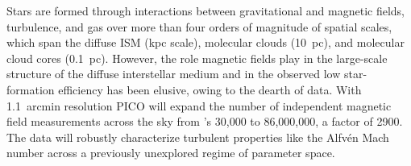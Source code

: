 \documentclass[PICOAPC.tex]{subfiles}
\begin{document}
Stars are formed through interactions between gravitational and magnetic fields, turbulence, and gas over more than four orders of magnitude of spatial scales, which span the diffuse ISM (kpc scale), molecular clouds (10~pc), and molecular cloud cores (0.1~pc). However, the role magnetic fields play in the large-scale structure of the diffuse interstellar medium and in the observed low star-formation efficiency has been elusive, owing to the dearth of data. 
With 1.1~arcmin resolution PICO will expand the number of independent magnetic field measurements across the sky from \planck 's  30,000 to 86,000,000, a factor of 2900. The data will robustly characterize turbulent properties like the Alfv\'{e}n Mach number across a previously unexplored regime of parameter space. 
\end{document}
